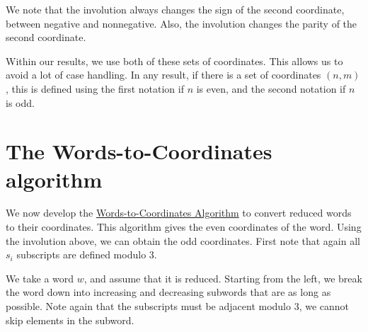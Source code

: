 \documentclass[11pt]{article}
\begin{document}
\begin{remark}
    We note that the involution always changes the sign of the second coordinate, between negative and nonnegative. Also, the involution changes the parity of the second coordinate.
\end{remark}
 


Within our results, we use both of these sets of coordinates. This allows us to avoid a lot of case handling. In any result, if there is a set of coordinates $(n,m)$, this is defined using the first notation if $n$ is even, and the second notation if $n$ is odd. 


\section{The Words-to-Coordinates algorithm}\label{algo}
We now develop the \hyperref[algorithm]{Words-to-Coordinates Algorithm} to convert reduced words to their coordinates. This algorithm gives the even coordinates of the word. Using the involution above, we can obtain the odd coordinates. First note that again all $s_i$ subscripts are defined modulo 3. 

We take a word $w$, and assume that it is reduced. Starting from the left, we break the word down into increasing and decreasing subwords that are as long as possible. Note again that the subscripts must be adjacent modulo 3, we cannot skip elements in the subword. 
\end{document}

